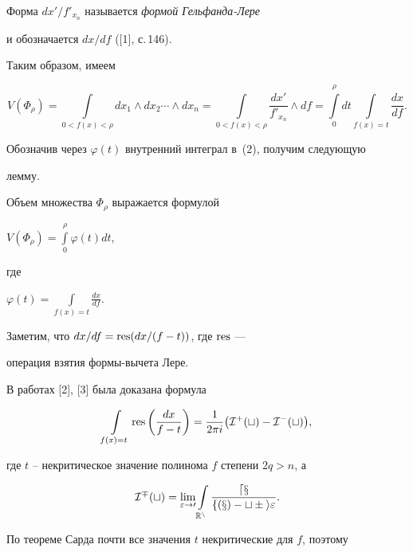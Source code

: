 Форма $dx'/f'_{x_n}$ называется {\it формой Гельфанда-Лере}


и обозначается $dx/df$ ([1], с.\,146).


Таким образом, имеем


\begin{equation}


V(\Phi_{\rho})=


\int\limits_{0<f(x)<\rho}{dx_1\land dx_2\dotsb\land dx_n}=


\int\limits_{0<f(x)<\rho}


\frac{dx'}{f'_{x_n}}\land df=


\int\limits_0^\rho{dt}\int\limits_{f(x)=t}\frac{dx}{df}.


\end{equation}


Обозначив через $\varphi (t)$ внутренний интеграл в~(2), получим следующую


лемму.





\begin{lem} Объем множества $\Phi_\rho$ выражается формулой


$V(\Phi_\rho)=\int\limits_0^\rho{\varphi (t)dt}$,


где


$\varphi (t)=\int\limits_{f(x)=t}\frac{dx}{df}$.


\end{lem}





Заметим, что ${dx}/{df}=\operatorname{res} ({dx}/{(f-t)})$, где $\operatorname{res}$ ---


операция взятия формы-вычета Лере.


В работах [2], [3] была доказана формула


$$


\int\limits_{f(x)=t}{\res\bigg (\frac{dx}{f-t}\bigg)}=


\frac{1}{2\pi i}\big (\I^+(t)-\I^-(t)\big ),


$$


где $t$ -- некритическое значение полинома $f$ степени $2q>n$, а


$$


\I^\mp (t)=


\lim_{\varepsilon\to 0}\int\limits_{\Bbb{R}^n}\frac


{dx}{f(x)-t\pm i\varepsilon}.


$$


По теореме Сарда почти все значения $t$ некритические для $f$, поэтому


